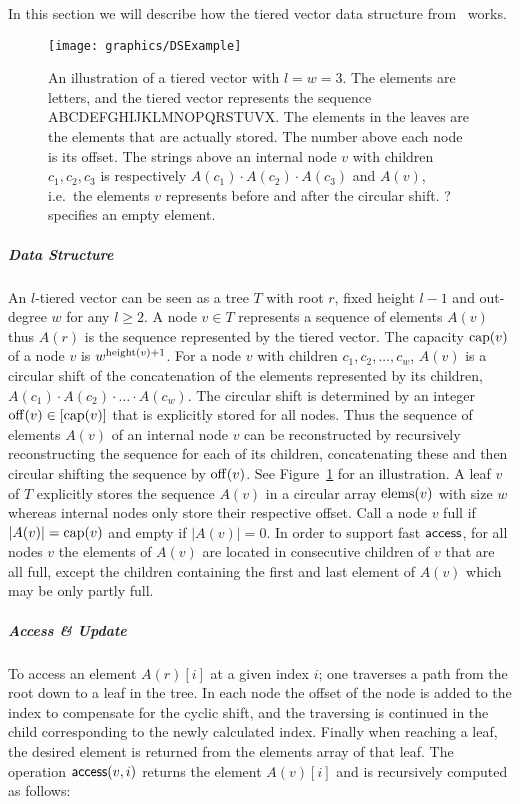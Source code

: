 
In this section we will describe how the tiered vector data structure
from~\cite{Goodrich1999} works. 

\begin{figure}
	\texttt{[image: graphics/DSExample]}
    \caption{An illustration of a tiered vector with $l = w = 3$. The elements are letters, and the tiered vector represents the sequence ABCDEFGHIJKLMNOPQRSTUVX. The elements in the leaves are the elements that are actually stored. The number above each node is its offset. The strings above an internal node $v$ with children $c_1, c_2, c_3$ is respectively $A(c_1) \cdot A(c_2) \cdot A(c_3)$ and $A(v)$, i.e.\ the elements $v$ represents before and after the circular shift. ? specifies an empty element.}
\label{fig:ds}
\end{figure}

\subparagraph*{Data Structure} 
An $l$-tiered vector can be seen as a tree $T$ with root $r$, fixed
height $l - 1$ and out-degree $w$ for any $l \geq 2$.
A node $v \in T$ represents a sequence of elements $A(v)$ thus 
$A(r)$ is the sequence represented by the tiered vector. The capacity $\mathrm{cap}(v)$ of a node $v$ is $w^{\mathrm{height}(v)+1}$. For a node $v$ with children $c_1, c_2, \ldots, c_w$, $A(v)$ is a circular shift of the
concatenation of the elements represented by its children, 
$A(c_1) \cdot A(c_2) \cdot \ldots \cdot A(c_w)$.
The circular shift is determined by an integer $\mathrm{off}(v)
\in [\mathrm{cap}(v)]$ that is explicitly stored for all nodes. Thus the sequence of
elements $A(v)$ of an internal node $v$ can be reconstructed by recursively
reconstructing the sequence for each of its children, concatenating these and
then circular shifting the sequence by $\mathrm{off}(v)$. See Figure~\ref{fig:ds} for an illustration. A leaf $v$ of $T$
explicitly stores the sequence $A(v)$ in a circular array $\mathrm{elems}(v)$ with
size $w$ whereas internal nodes only store their respective offset.
 Call a node $v$ full if $|A(v)| = \mathrm{cap}(v)$ and empty if $|A(v)| = 0$. In order to support fast $\mathsf{access}$, for all nodes $v$ the elements of $A(v)$ are located in consecutive children of $v$ that
are all full, except the children containing the first
and last element of $A(v)$ which may be only partly full.

\subparagraph*{Access \& Update}
To access an element $A(r)[i]$ at a given index $i$; one traverses a
path from the root down to a leaf in the tree. In each node the offset of the
node is added to the index to compensate for the cyclic shift, and the traversing is continued in the child corresponding to the newly calculated index. 
Finally when reaching a leaf, the desired element is
returned from the elements array of that leaf. The operation $\mathsf{access}(v, i)$ returns the
element $A(v)[i]$ and is recursively computed as follows:

